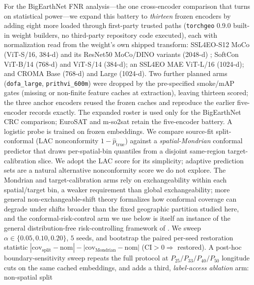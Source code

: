 \documentclass[11pt]{article}
\begin{document}
For the BigEarthNet FNR analysis---the one cross-encoder comparison that turns on statistical power---we
expand this battery to \emph{thirteen} frozen encoders by adding eight more loaded through first-party
trusted paths (\texttt{torchgeo} 0.9.0 built-in weight builders, no third-party repository code
executed), each with normalization read from the weight's own shipped transform: SSL4EO-S12 MoCo
(ViT-S/16, 384-d) and its ResNet50 MoCo/DINO variants (2048-d) \citep{wang2023ssl4eo}; SoftCon
\citep{wang2024softcon} ViT-B/14 (768-d) and ViT-S/14 (384-d); an SSL4EO MAE ViT-L/16 (1024-d); and
CROMA \citep{fuller2023croma} Base (768-d) and Large (1024-d). Two further planned arms
(\texttt{dofa\_large}, \texttt{prithvi\_600m}) were dropped by the pre-specified smoke/mAP gates (missing
or non-finite feature caches at extraction), leaving thirteen scored; the three anchor encoders reused
the frozen caches and reproduce the earlier five-encoder records exactly. The expanded roster is used
only for the BigEarthNet CRC comparison; EuroSAT and m-so2sat retain the five-encoder battery.
A logistic probe is trained on frozen embeddings. We compare source-fit
split-conformal \citep{vovk2005algorithmic,angelopoulos2023conformal} (LAC \citep{sadinle2019lac} nonconformity $1-\hat p_{\text{true}}$) against a \emph{spatial-Mondrian} conformal
predictor \citep{vovk2003mondrian} that draws per-spatial-bin quantiles from a disjoint same-region target-calibration slice. We adopt
the LAC score for its simplicity; adaptive prediction sets \citep{romano2020classification} are a natural
alternative nonconformity score we do not explore. The Mondrian and target-calibration arms rely on
exchangeability within each spatial/target bin, a weaker requirement than global exchangeability; more general
non-exchangeable-shift theory \citep{barber2023conformal} formalizes how conformal coverage can degrade under
shifts broader than the fixed geographic partition studied here, and the conformal-risk-control arm we use
below \citep{angelopoulos2024crc} is itself an instance of the general distribution-free risk-controlling
framework of \citet{bates2021distributionfree}. We sweep
$\alpha\in\{0.05,0.10,0.20\}$, $5$ seeds, and bootstrap the paired per-seed restoration statistic
$|\text{cov}_{\text{split}}-\text{nom}|-|\text{cov}_{\text{Mondrian}}-\text{nom}|$ (CI${}>0\Rightarrow$ restored).
A post-hoc boundary-sensitivity sweep repeats the full protocol at $P_{25}/P_{33}/P_{40}/P_{50}$ longitude
cuts on the same cached embeddings, and adds a third, \emph{label-access ablation} arm: non-spatial split
\end{document}
